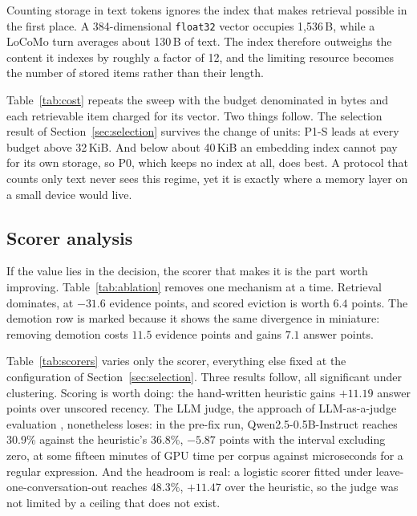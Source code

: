 Counting storage in text tokens ignores the index that makes retrieval
possible in the first place. A 384-dimensional \texttt{float32} vector occupies 1{,}536\,B, while
a LoCoMo turn averages about 130\,B of text. The index therefore outweighs the
content it indexes by roughly a factor of 12, and the limiting resource becomes
the number of stored items rather than their length.

Table~\ref{tab:cost} repeats the sweep with the budget denominated in bytes and
each retrievable item charged for its vector. Two things follow. The selection result of Section~\ref{sec:selection}
survives the change of units: P1-S leads at every budget above 32\,KiB. And
below about 40\,KiB an embedding index cannot pay for its own storage, so P0,
which keeps no index at all, does best. A protocol that counts only text never
sees this regime, yet it is exactly where a memory layer on a small device
would live.

\begin{table}[t]
\caption{Answer recall (\%) with the budget denominated in bytes, charging
1{,}536\,B per retrievable item for its embedding. P0 maintains no index and is
therefore flat.}
\label{tab:cost}
\centering
\small

\end{table}

\subsection{Scorer analysis}
\label{sec:scorer}

If the value lies in the decision, the scorer that makes it is the part worth
improving. Table~\ref{tab:ablation} removes one mechanism at a time.
Retrieval dominates, at $-31.6$ evidence points, and scored eviction is worth
$6.4$ points. The demotion row is marked because it shows the same divergence
in miniature: removing demotion costs $11.5$ evidence points and gains $7.1$
answer points.

\begin{table}[t]
\caption{Component ablation at $S=4096$, showing the change from the full
system. $\dagger$: the row on which the two metrics disagree in direction.}
\label{tab:ablation}
\centering
\small

\end{table}

Table~\ref{tab:scorers} varies only the scorer, everything else fixed at the
configuration of Section~\ref{sec:selection}. Three results follow, all
significant under clustering. Scoring is worth doing: the hand-written
heuristic gains $+11.19$ answer points over unscored recency. The LLM judge, the approach of LLM-as-a-judge evaluation
\cite{zheng2023judge}, nonetheless loses: in the pre-fix run, Qwen2.5-0.5B-Instruct reaches 30.9\%
against the heuristic's 36.8\%, $-5.87$ points with the interval excluding zero, at some
fifteen minutes of GPU time per corpus against microseconds for a regular
expression. And the headroom is real: a logistic scorer fitted under
leave-one-conversation-out reaches 48.3\%, $+11.47$ over the heuristic, so the
judge was not limited by a ceiling that does not exist.


